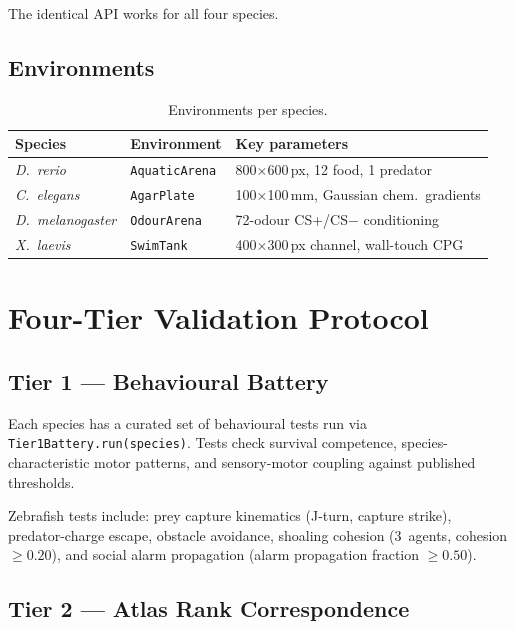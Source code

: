 \documentclass[11pt,a4paper]{article}
\begin{document}
The identical API works for all four species.

\subsection{Environments}

\begin{table}[h]
\centering
\caption{Environments per species.}
\begin{tabular}{lll}
\toprule
Species & Environment & Key parameters \\
\midrule
\textit{D.\ rerio}         & \texttt{AquaticArena}  & 800$\times$600\,px, 12 food, 1 predator \\
\textit{C.\ elegans}       & \texttt{AgarPlate}     & 100$\times$100\,mm, Gaussian chem.\ gradients \\
\textit{D.\ melanogaster}  & \texttt{OdourArena}    & 72-odour CS+/CS$-$ conditioning \\
\textit{X.\ laevis}        & \texttt{SwimTank}      & 400$\times$300\,px channel, wall-touch CPG \\
\bottomrule
\end{tabular}
\end{table}

\section{Four-Tier Validation Protocol}

\subsection{Tier 1 — Behavioural Battery}

Each species has a curated set of behavioural tests run via
\texttt{Tier1Battery.run(species)}.
Tests check survival competence, species-characteristic motor
patterns, and sensory-motor coupling against published thresholds.

Zebrafish tests include: prey capture kinematics (J-turn, capture
strike), predator-charge escape, obstacle avoidance, shoaling
cohesion (3~agents, cohesion $\geq 0.20$), and social alarm
propagation (alarm propagation fraction $\geq 0.50$).

\subsection{Tier 2 — Atlas Rank Correspondence}
\end{document}
